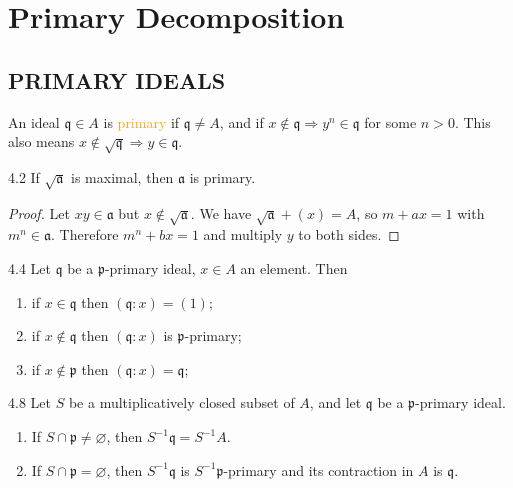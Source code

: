 \chapter{Primary Decomposition}

\section*{PRIMARY IDEALS}

\begin{definition}
	An ideal $\mathfrak{q}\in A$ is \textcolor{orange}{primary} if $\mathfrak{q}\neq A$, and if $x\notin\mathfrak{q}\Rightarrow y^n\in\mathfrak{q}$ for some $n>0$. This also means $x\notin\sqrt{\mathfrak{q}}\Rightarrow y\in\mathfrak{q}$.
\end{definition}

\begin{proposition}{4.2}
	If $\sqrt{\mathfrak{a}}$ is maximal, then $\mathfrak{a}$ is primary.
	\begin{proof}
		Let $xy\in\mathfrak{a}$ but $x\notin\sqrt{\mathfrak{a}}$. We have $\sqrt{\mathfrak{a}}+(x)=A$, so $m+ax=1$ with $m^n\in\mathfrak{a}$. Therefore $m^n+bx=1$ and multiply $y$ to both sides.
	\end{proof}
\end{proposition}

\begin{proposition}{4.4}
	Let $\mathfrak{q}$ be a $\mathfrak{p}$-primary ideal, $x\in A$ an element. Then
	\begin{enumerate}[label=\textup{(\roman*)}]
		\item if $x\in\mathfrak{q}$ then $(\mathfrak{q}:x)=(1)$;
		\item if $x\notin\mathfrak{q}$ then $(\mathfrak{q}:x)$ is $\mathfrak{p}$-primary;
		\item if $x\notin\mathfrak{p}$ then $(\mathfrak{q}:x)=\mathfrak{q}$;
	\end{enumerate}
\end{proposition}

\begin{proposition}{4.8}
	Let $S$ be a multiplicatively closed subset of $A$, and let $\mathfrak{q}$ be a $\mathfrak{p}$-primary ideal.
	\begin{enumerate}[label=\textup{(\roman*)}]
		\item If $S\cap\mathfrak{p}\neq\varnothing$, then $S^{-1}\mathfrak{q}=S^{-1}A$.
		\item If $S\cap\mathfrak{p}=\varnothing$, then $S^{-1}\mathfrak{q}$ is $S^{-1}\mathfrak{p}$-primary and its contraction in $A$ is $\mathfrak{q}$.
	\end{enumerate}
\end{proposition}

